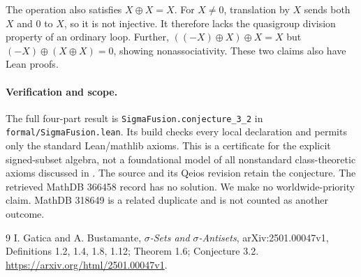 \documentclass[11pt]{article}
\begin{document}
The operation also satisfies $X\oplus X=X$. For $X\ne0$, translation by $X$
sends both $X$ and $0$ to $X$, so it is not injective. It therefore lacks the
quasigroup division property of an ordinary loop. Further,
$((-X)\oplus X)\oplus X=X$ but $(-X)\oplus(X\oplus X)=0$, showing
nonassociativity. These two claims also have Lean proofs.

\paragraph{Verification and scope.}
The full four-part result is \texttt{SigmaFusion.conjecture\_3\_2} in
\texttt{formal/SigmaFusion.lean}. Its build checks every local declaration
and permits only the standard Lean/mathlib axioms. This is a certificate
for the explicit signed-subset algebra, not a foundational model of all
nonstandard class-theoretic axioms discussed in \cite{GB}.
The source and its Qeios revision retain the conjecture. The retrieved
MathDB 366458 record has no solution. We make no worldwide-priority claim.
MathDB 318649 is a related duplicate and is not counted as another outcome.
\begin{thebibliography}{9}
 I. Gatica and A. Bustamante, \emph{$\sigma$-Sets and
$\sigma$-Antisets}, arXiv:2501.00047v1, Definitions 1.2, 1.4, 1.8, 1.12;
Theorem 1.6; Conjecture 3.2.
\url{https://arxiv.org/html/2501.00047v1}.
\end{thebibliography}
\end{document}
